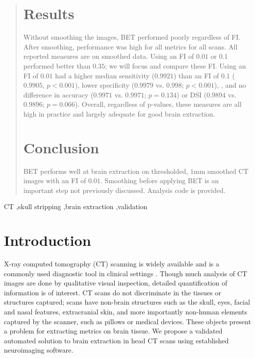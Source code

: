 \documentclass{elsarticle}\usepackage[]{graphicx}\usepackage[]{color}
\begin{document}
\begin{frontmatter}
\begin{abstract}
\section{Results}

Without smoothing the images, BET performed poorly regardless of FI.  After smoothing, performance was high for all metrics for all scans.  All reported measures are on smoothed data.  Using an FI of $0.01$ or $0.1$ performed better than $0.35$; we will focus and compare these FI.  Using an FI of $0.01$ had a higher median sensitivity ($0.9921$) than an FI of $0.1$ ($0.9905$, $p< 0.001$), lower specificity ($0.9979$ vs. $0.998$; $p< 0.001$), , and no difference in accuracy ($0.9971$ vs. $0.9971$; $p= 0.134$) or DSI ($0.9894$ vs. $0.9896$; $p= 0.066$).  Overall, regardless of p-values, these measures are all high in practice and largely adequate for good brain extraction.

\section{Conclusion}

BET performs well at brain extraction on thresholded, $1$mm smoothed CT images with an FI of $0.01$.  Smoothing before applying BET is an important step not previously discussed.  Analysis code is provided.

\end{abstract}
\maketitle
\begin{keyword}
CT \sep skull stripping \sep brain extraction \sep validation
\end{keyword}

\end{frontmatter}



\section{Introduction}

X-ray computed tomography (CT) scanning is widely available and is a commonly used diagnostic tool in clinical settings \citep{sahni_management_2007}. Though much analysis of CT images are done by qualitative visual inspection, detailed quantification of information is of interest.  CT scans do not discriminate in the tissues or structures captured; scans have non-brain structures such as the skull, eyes, facial and nasal features, extracranial skin, and more importantly non-human elements captured by the scanner, such as pillows or medical devices.  These objects present a problem for extracting metrics on brain tissue.  We propose a validated automated solution to brain extraction in head CT scans using established neuroimaging software.
\end{document}
